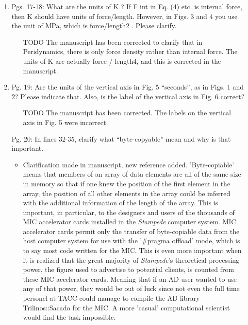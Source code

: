 \documentclass{article}
\begin{document}
\begin{enumerate}
  \item
    Pgs. 17-18: What are the units of K ? If F int in Eq. (4) etc. is internal force, then K
    should have units of force/length. However, in Figs. 3 and 4 you use the unit of
    MPa, which is force/length2 . Please clarify.

{\color{red}  
\begin{itemize}
     \item
[TODO]
    The manuscript has been corrected to clarify that in Peridynamics, there is only force density rather than internal force. The units of K are actually force / length4, and this is corrected in the manuscript.
  \end{itemize}}

    \item
        Pg. 19: Are the units of the vertical axis in Fig. 5 “seconds”, as in Figs. 1 and 2?
        Please indicate that. Also, is the label of the vertical axis in Fig. 6 correct?

{\color{red}  
\begin{itemize}
     \item
[TODO]
        The manuscript has been corrected. The labels on the vertical axis in Fig. 5 were incorrect. 
  \end{itemize}}


Pg. 20: In lines 32-35, clarify what “byte-copyable” mean and why is that important.

{\color{red}  
\begin{itemize}
     \item
     Clarification made in manuscript, new reference added. 
     'Byte-copiable' means that members of an array of data elements are all of
     the same size in memory so that if one knew the position of the first
     element in the array, the position of all other elements in the array
     could be inferred with the additional information of the length of the
     array. This is important, in particular, to the designers and users of the
     thousands of MIC accelerator cards installed in the \emph{Stampede}
     computer system. MIC accelerator cards permit only the transfer of
     byte-copiable data from the host computer system for use with the '#pragma
     offload' mode, which is to say most code written for the MIC. This is even
     more important when it is realized that the great majority of
     \emph{Stampede}'s theoretical processing power, the figure used to advertise to potential clients, is counted from these MIC
     accelerator cards. Meaning that if an AD user wanted to use any of that
     power, they would be out of luck since not even the full time personel at
     TACC could manage to compile the AD library Trilinos::Sacado for the MIC.
     A more 'casual' computational scientist would find the task impossible.
  \end{itemize}}


\end{enumerate}
\end{document}
